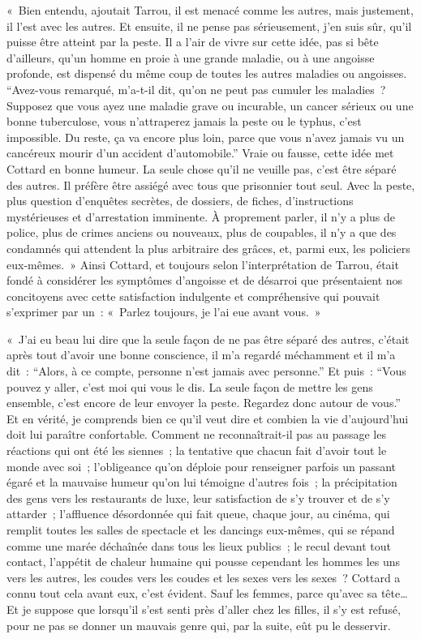\documentclass[french,twoside]{book} %
\begin{document}
« Bien entendu, ajoutait Tarrou, il est menacé comme les autres, mais justement, il l’est avec les autres. Et ensuite, il ne pense pas sérieusement, j’en suis sûr, qu’il puisse être atteint par la peste. Il a l’air de vivre sur cette idée, pas si bête d’ailleurs, qu’un homme en proie à une grande maladie, ou à une angoisse profonde, est dispensé du même coup de toutes les autres maladies ou angoisses. “Avez-vous remarqué, m’a-t-il dit, qu’on ne peut pas cumuler les maladies ? Supposez que vous ayez une maladie grave ou incurable, un cancer sérieux ou une bonne tuberculose, vous n’attraperez jamais la peste ou le typhus, c’est impossible. Du reste, ça va encore plus loin, parce que vous n’avez jamais vu un cancéreux mourir d’un accident d’automobile.” Vraie ou fausse, cette idée met Cottard en bonne humeur. La seule chose qu’il ne veuille pas, c’est être séparé des autres. Il préfère être assiégé avec tous que prisonnier tout seul. Avec la peste, plus question d’enquêtes secrètes, de dossiers, de fiches, d’instructions mystérieuses et d’arrestation imminente. À proprement parler, il n’y a plus de police, plus de crimes anciens ou nouveaux, plus de coupables, il n’y a que des condamnés qui attendent la plus arbitraire des grâces, et, parmi eux, les policiers eux-mêmes. » Ainsi Cottard, et toujours selon l’interprétation de Tarrou, était fondé à considérer les symptômes d’angoisse et de désarroi que présentaient nos concitoyens avec cette satisfaction indulgente et compréhensive qui pouvait s’exprimer par un : « Parlez toujours, je l’ai eue avant vous. »\par
« J’ai eu beau lui dire que la seule façon de ne pas être séparé des autres, c’était après tout d’avoir une bonne conscience, il m’a regardé méchamment et il m’a dit : “Alors, à ce compte, personne n’est jamais avec personne.” Et puis : “Vous pouvez y aller, c’est moi qui vous le dis. La seule façon de mettre les gens ensemble, c’est encore de leur envoyer la peste. Regardez donc autour de vous.” Et en vérité, je comprends bien ce qu’il veut dire et combien la vie d’aujourd’hui doit lui paraître confortable. Comment ne reconnaîtrait-il pas au passage les réactions qui ont été les siennes ; la tentative que chacun fait d’avoir tout le monde avec soi ; l’obligeance qu’on déploie pour renseigner parfois un passant égaré et la mauvaise humeur qu’on lui témoigne d’autres fois ; la précipitation des gens vers les restaurants de luxe, leur satisfaction de s’y trouver et de s’y attarder ; l’affluence désordonnée qui fait queue, chaque jour, au cinéma, qui remplit toutes les salles de spectacle et les dancings eux-mêmes, qui se répand comme une marée déchaînée dans tous les lieux publics ; le recul devant tout contact, l’appétit de chaleur humaine qui pousse cependant les hommes les uns vers les autres, les coudes vers les coudes et les sexes vers les sexes ? Cottard a connu tout cela avant eux, c’est évident. Sauf les femmes, parce qu’avec sa tête… Et je suppose que lorsqu’il s’est senti près d’aller chez les filles, il s’y est refusé, pour ne pas se donner un mauvais genre qui, par la suite, eût pu le desservir.\par
\end{document}
